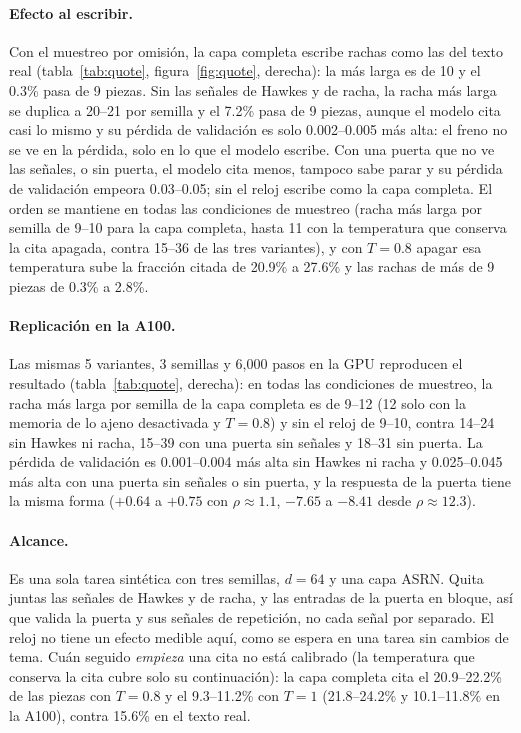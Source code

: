 \paragraph{Efecto al escribir.} Con el muestreo por omisión, la capa completa escribe rachas como las del texto real
(tabla~\ref{tab:quote}, figura~\ref{fig:quote}, derecha): la más larga es de 10 y el 0.3\% pasa de 9 piezas. Sin las
señales de Hawkes y de racha, la racha más larga se duplica a 20--21 por semilla y el 7.2\% pasa de 9 piezas, aunque el
modelo cita casi lo mismo y su pérdida de validación es solo 0.002--0.005 más alta: el freno no se ve en la pérdida,
solo en lo que el modelo escribe. Con una puerta que no ve las señales, o sin puerta, el modelo cita menos, tampoco sabe
parar y su pérdida de validación empeora 0.03--0.05; sin el reloj escribe como la capa completa. El orden se mantiene
en todas las condiciones de muestreo (racha más larga por semilla de 9--10 para la capa completa, hasta 11 con la
temperatura que conserva la cita apagada, contra 15--36 de las tres variantes), y con $T=0.8$ apagar esa temperatura
sube la fracción citada de 20.9\% a 27.6\% y las rachas de más de 9 piezas de 0.3\% a 2.8\%.

\paragraph{Replicación en la A100.} Las mismas 5 variantes, 3 semillas y 6{,}000 pasos en la GPU reproducen el
resultado (tabla~\ref{tab:quote}, derecha): en todas las condiciones de muestreo, la racha más larga por semilla de la
capa completa es de 9--12 (12 solo con la memoria de lo ajeno desactivada y $T=0.8$) y sin el reloj de 9--10, contra
14--24 sin Hawkes ni racha, 15--39 con una puerta sin señales y 18--31 sin puerta. La pérdida de validación es
0.001--0.004 más alta sin Hawkes ni racha y 0.025--0.045 más alta con una puerta sin señales o sin puerta, y la
respuesta de la puerta tiene la misma forma ($+0.64$ a $+0.75$ con $\rho\approx1.1$, $-7.65$ a $-8.41$ desde
$\rho\approx12.3$).

\paragraph{Alcance.} Es una sola tarea sintética con tres semillas, $d=64$ y una capa ASRN. Quita juntas las señales de
Hawkes y de racha, y las entradas de la puerta en bloque, así que valida la puerta y sus señales de repetición, no cada
señal por separado. El reloj no tiene un efecto medible aquí, como se espera en una tarea sin cambios de tema. Cuán
seguido \emph{empieza} una cita no está calibrado (la temperatura que conserva la cita cubre solo su continuación): la
capa completa cita el 20.9--22.2\% de las piezas con $T=0.8$ y el 9.3--11.2\% con $T=1$ (21.8--24.2\% y 10.1--11.8\% en
la A100), contra 15.6\% en el texto real.
